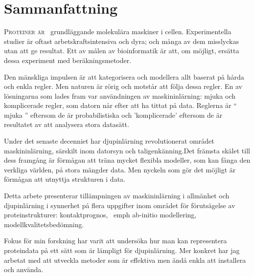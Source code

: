 \chapter*{Sammanfattning}
\lettrine[lines=3, lhang=0.25, nindent=0em, findent=2pt]{\color{Maroon}P}{roteiner är\ } grundläggande molekulära maskiner i cellen. Experimentella studier är oftast arbetskraftsintensiva och dyra; och många av dem misslyckas utan att ge resultat. Ett av målen av bioinformatik är att, om möjligt, ersätta dessa experiment med beräkningsmetoder.

Den mänskliga impulsen är att kategorisera och modellera allt baserat på hårda och enkla regler.
Men naturen är rörig och motstår att följa dessa regler.
En av lösningarna som lades fram var användningen av maskininlärning: mjuka och komplicerade regler, som datorn når efter att ha tittat på data.
Reglerna är `` mjuka '' eftersom de är probabilistiska och 'komplicerade' eftersom de är resultatet av att analysera stora datasätt.

Under det senaste decenniet har djupinlärning revolutionerat området maskininlärning, särskilt inom datorsyn och taligenkänning.Det främsta skälet till dess framgång är förmågan att träna mycket flexibla modeller, som kan fånga den verkliga världen, på stora mängder data. Men nyckeln som gör det möjligt är förmågan att utnyttja strukturen i data.

Detta arbete presenterar tillämpningen av maskininlärning i allmänhet och djupinlärning i synnerhet på flera uppgifter inom området för förutsägelse av proteinstrukturer: kontaktprognos, \ emph {ab-initio} modellering, modellkvalitetsbedömning.

Fokus för min forskning har varit att undersöka hur man kan representera proteindata på ett sätt som är lämpligt för djupinlärning. Mer konkret har jag arbetat med att utveckla metoder som är effektiva men ändå enkla att installera och använda.